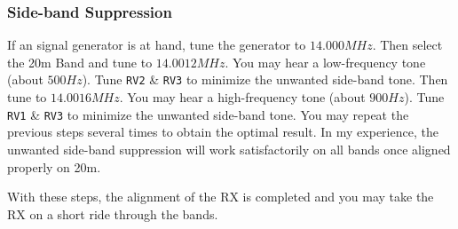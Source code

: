 \documentclass[10pt, a4paper,twoside]{scrartcl}
\begin{document}
\subsubsection{Side-band Suppression}
If an signal generator is at hand, tune the generator to $14.000 MHz$. Then select the 20m Band and tune to $14.0012 MHz$. You may hear a low-frequency tone (about $500Hz$). Tune \texttt{RV2} \& \texttt{RV3} to minimize the unwanted side-band tone. Then tune to $14.0016 MHz$. You may hear a high-frequency tone (about $900 Hz$). Tune \texttt{RV1} \& \texttt{RV3} to minimize the unwanted side-band tone. You may repeat the previous steps several times to obtain the optimal result. In my experience, the unwanted side-band suppression will work satisfactorily on all bands once aligned properly on 20m. 

With these steps, the alignment of the RX is completed and you may take the RX on a short ride through the bands.

\clearpage
\end{document}
